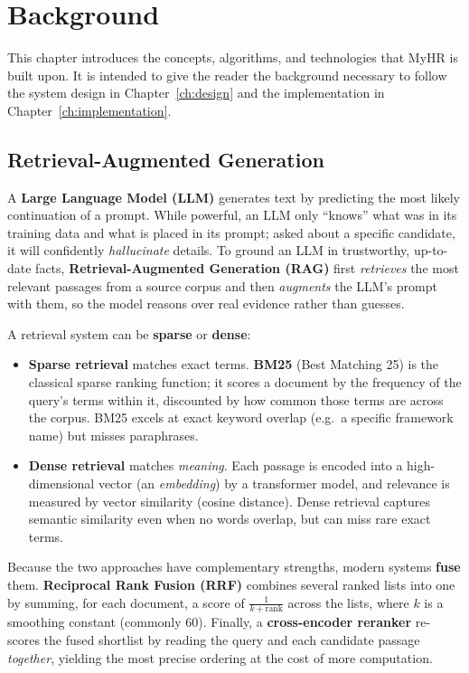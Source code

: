\documentclass[12pt,a4paper,oneside]{report}
\begin{document}
\chapter{Background}
\label{ch:background}

This chapter introduces the concepts, algorithms, and technologies that MyHR is built upon. It
is intended to give the reader the background necessary to follow the system design in
Chapter~\ref{ch:design} and the implementation in Chapter~\ref{ch:implementation}.

\section{Retrieval-Augmented Generation}

A \textbf{Large Language Model (LLM)} generates text by predicting the most likely continuation
of a prompt. While powerful, an LLM only ``knows'' what was in its training data and what is
placed in its prompt; asked about a specific candidate, it will confidently \textit{hallucinate}
details. To ground an LLM in trustworthy, up-to-date facts, \textbf{Retrieval-Augmented
Generation (RAG)} first \textit{retrieves} the most relevant passages from a source corpus and
then \textit{augments} the LLM's prompt with them, so the model reasons over real evidence
rather than guesses.

A retrieval system can be \textbf{sparse} or \textbf{dense}:

\begin{itemize}
  \item \textbf{Sparse retrieval} matches exact terms. \textbf{BM25} (Best Matching 25) is the
    classical sparse ranking function; it scores a document by the frequency of the query's
    terms within it, discounted by how common those terms are across the corpus. BM25 excels at
    exact keyword overlap (e.g.\ a specific framework name) but misses paraphrases.
  \item \textbf{Dense retrieval} matches \textit{meaning}. Each passage is encoded into a
    high-dimensional vector (an \textit{embedding}) by a transformer model, and relevance is
    measured by vector similarity (cosine distance). Dense retrieval captures semantic
    similarity even when no words overlap, but can miss rare exact terms.
\end{itemize}

Because the two approaches have complementary strengths, modern systems \textbf{fuse} them.
\textbf{Reciprocal Rank Fusion (RRF)} combines several ranked lists into one by summing, for
each document, a score of $\frac{1}{k + \text{rank}}$ across the lists, where $k$ is a
smoothing constant (commonly 60). Finally, a \textbf{cross-encoder reranker} re-scores the
fused shortlist by reading the query and each candidate passage \textit{together}, yielding the
most precise ordering at the cost of more computation.
\end{document}
